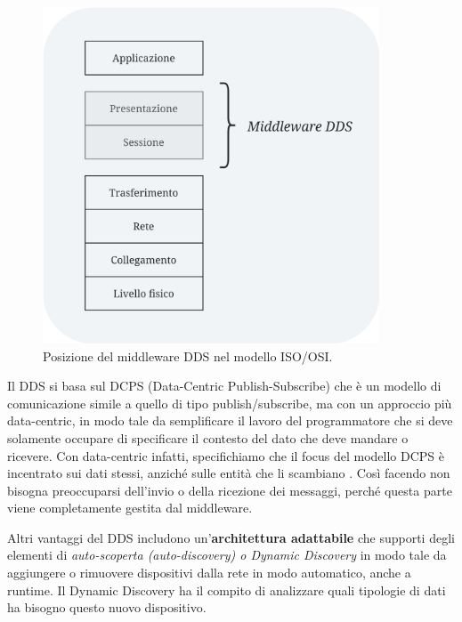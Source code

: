 \begin{figure}[H]
    \centering
    \includegraphics[width=10cm, keepaspectratio]{img/ModelloISOOSIDDS-Pagina-3.jpg}
    \caption{Posizione del middleware DDS nel modello ISO/OSI.}
    \label{DDSISOOSI}
\end{figure}


Il DDS si basa sul DCPS (Data-Centric Publish-Subscribe) 
che è un modello di comunicazione simile a quello
di tipo publish/subscribe, ma con un approccio più data-centric, in modo
tale da semplificare il lavoro del programmatore che si deve solamente
occupare di specificare il contesto del dato che deve mandare o ricevere.
Con data-centric infatti, specifichiamo che il focus del modello DCPS 
è incentrato 
sui dati stessi, anziché sulle entità che li scambiano \cite{whatisdds}.
Così facendo non bisogna preoccuparsi dell'invio o della ricezione
dei messaggi, perché questa parte viene completamente gestita dal middleware.


Altri vantaggi del DDS includono 
un'\textbf{architettura adattabile} che supporti
degli elementi di \textit{auto-scoperta (auto-discovery) o Dynamic Discovery} 
in modo tale da aggiungere o 
rimuovere dispositivi dalla rete in modo automatico, anche a runtime.
Il Dynamic Discovery ha il compito di analizzare quali tipologie di dati 
ha bisogno questo nuovo dispositivo. 

